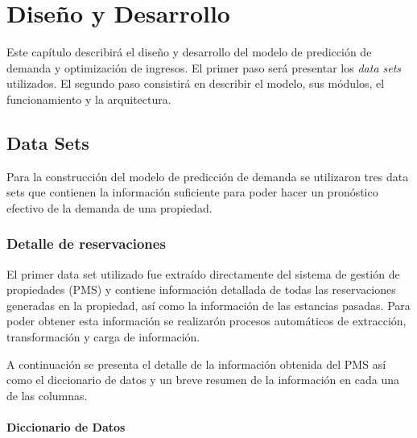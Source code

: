 \chapter{Diseño y Desarrollo}
\label{ch:modelo}

Este capítulo describirá el diseño y desarrollo del modelo de predicción de demanda y optimización de ingresos. El primer paso será presentar los \emph{data sets} utilizados. El segundo paso consistirá en describir el modelo, sus módulos, el funcionamiento y la arquitectura.

\section*{Data Sets}
Para la construcción del modelo de predicción de demanda se utilizaron tres data sets que contienen la información suficiente para poder hacer un pronóstico efectivo de la demanda de una propiedad.

\subsection*{Detalle de reservaciones}


El primer data set utilizado fue extraído directamente del sistema de gestión de propiedades (PMS) y contiene información detallada de todas las reservaciones generadas en la propiedad, así como la información de las estancias pasadas. Para poder obtener esta información se realizarón procesos automáticos de extracción, transformación y carga de información. 

A continuación se presenta el detalle de la información obtenida del PMS así como el diccionario de datos y un breve resumen de la información en cada una de las columnas.

\subsubsection*{Diccionario de Datos}


